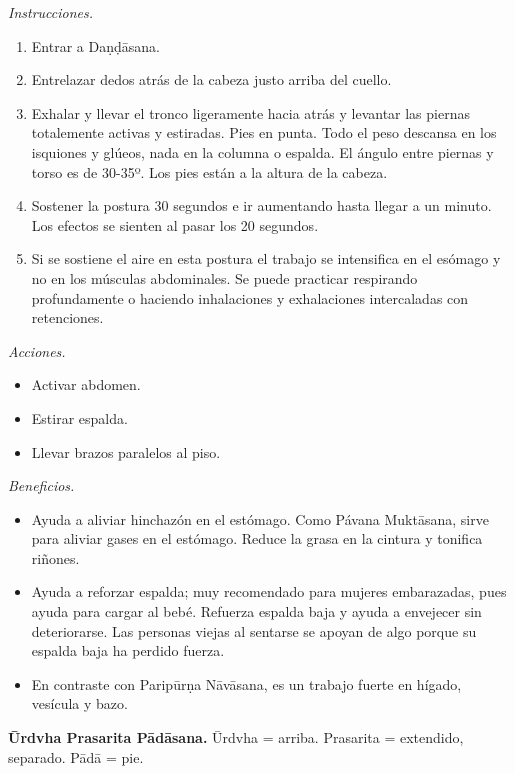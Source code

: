 \emph{Instrucciones.}
\begin{enumerate}
\item Entrar a Daṇḍāsana.
\item Entrelazar dedos atrás de la cabeza
justo arriba del cuello.
\item Exhalar y llevar el tronco ligeramente
hacia atrás y levantar las piernas
totalemente activas y estiradas. Pies en
punta. Todo el peso descansa en los isquiones
y glúeos, nada en la columna o espalda. El
ángulo entre piernas y torso es de 30-35º.
Los pies están a la altura de la cabeza.
\item Sostener la postura 30 segundos e ir
aumentando hasta llegar a un minuto. Los
efectos se sienten al pasar los 20 segundos.
\item Si se sostiene el aire en esta postura
el trabajo se intensifica en el esómago y no
en los músculas abdominales. Se puede
practicar respirando profundamente o haciendo
inhalaciones y exhalaciones intercaladas con
retenciones.
\end{enumerate}

\emph{Acciones.}
\begin{itemize}
\item Activar abdomen.
\item Estirar espalda.
\item Llevar brazos paralelos al piso.
\end{itemize}

\emph{Beneficios.}
\begin{itemize}
\item Ayuda a aliviar hinchazón en el
estómago. Como Pávana Muktāsana, sirve para
aliviar gases en el estómago. Reduce la grasa
en la cintura y tonifica riñones.
\item Ayuda a reforzar espalda; muy
recomendado para mujeres embarazadas, pues
ayuda para cargar al bebé. Refuerza espalda
baja y ayuda a envejecer sin deteriorarse.
Las personas viejas al sentarse se apoyan de
algo porque su espalda baja ha perdido
fuerza.
\item En contraste con Paripūrṇa Nāvāsana, es
un trabajo fuerte en hígado, vesícula y bazo.
\end{itemize}

\medskip\noindent\textbf{Ūrdvha Prasarita
Pādāsana.}
Ūrdvha = arriba. Prasarita = extendido,
separado. Pādā = pie.

